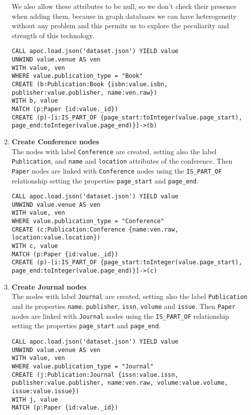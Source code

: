 \begin{enumerate}
    We also allow these attributes to be null, so we don't check their presence when adding them, because in graph databases we can have heterogeneity without any problem and this permits us to explore the peculiarity and strength of this technology.
    \begin{lstlisting}[label={lst:lstlisting4}]
CALL apoc.load.json('dataset.json') YIELD value
UNWIND value.venue AS ven
WITH value, ven
WHERE value.publication_type = "Book"
CREATE (b:Publication:Book {isbn:value.isbn, publisher:value.publisher, name:ven.raw})
WITH b, value
MATCH (p:Paper {id:value._id})
CREATE (p)-[i:IS_PART_OF {page_start:toInteger(value.page_start), page_end:toInteger(value.page_end)}]->(b)
    \end{lstlisting}
    \item \textbf{Create Conference nodes}\\
    The nodes with label \verb|Conference| are created, setting also the label \verb|Publication|, and \verb|name| and \verb|location| attributes of the conference.
    Then \verb|Paper| nodes are linked with \verb|Conference| nodes using the \verb|IS_PART_OF| relationship setting the properties \verb|page_start| and \verb|page_end|.
    \begin{lstlisting}[label={lst:lstlisting5}]
CALL apoc.load.json('dataset.json') YIELD value
UNWIND value.venue AS ven
WITH value, ven
WHERE value.publication_type = "Conference"
CREATE (c:Publication:Conference {name:ven.raw, location:value.location})
WITH c, value
MATCH (p:Paper {id:value._id})
CREATE (p)-[i:IS_PART_OF {page_start:toInteger(value.page_start), page_end:toInteger(value.page_end)}]->(c)
    \end{lstlisting}
    \item \textbf{Create Journal nodes}\\
    The nodes with label \verb|Journal| are created, setting also the label \verb|Publication| and its properties \verb|name|, \verb|publisher|, \verb|issn|, \verb|volume| and \verb|issue|.
    Then \verb|Paper| nodes are linked with \verb|Journal| nodes using the \verb|IS_PART_OF| relationship setting the properties \verb|page_start| and \verb|page_end|.
    \begin{lstlisting}[label={lst:lstlisting6}]
CALL apoc.load.json('dataset.json') YIELD value
UNWIND value.venue AS ven
WITH value, ven
WHERE value.publication_type = "Journal"
CREATE (j:Publication:Journal {issn:value.issn, publisher:value.publisher, name:ven.raw, volume:value.volume, issue:value.issue})
WITH j, value
MATCH (p:Paper {id:value._id})

\end{lstlisting}
\end{enumerate}
